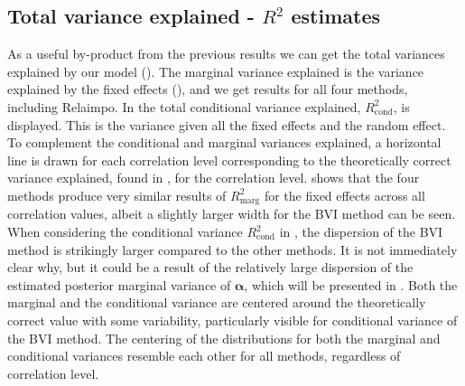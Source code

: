 \subsection{Total variance explained - $R^2$ estimates}
\label{sec:R2} 
As a useful by-product from the previous results we can get the total variances explained by our model ().
The marginal variance explained is the variance explained by the fixed effects (), and we get results for all four methods, including Relaimpo.
In  the total conditional variance explained, $R^2_{\text{cond}}$, is displayed. 
This is the variance given all the fixed effects and the random effect.
To complement the conditional and marginal variances explained, a horizontal line is drawn for each correlation level corresponding to the theoretically correct variance explained, found in , for the correlation level. 
\newline
\newline
{} shows that the four methods produce very similar results of $R^2_{\text{marg}}$ for the fixed effects across all correlation values, albeit a slightly larger width for the BVI method can be seen.
When considering the conditional variance $R^2_{\text{cond}}$ in , the dispersion of the BVI method is strikingly larger compared to the other methods. 
It is not immediately clear why, but it could be a result of the relatively large dispersion of the estimated posterior marginal variance of $\boldsymbol{\alpha}$, which will be presented in .
Both the marginal and the conditional variance are centered around the theoretically correct value with some variability, particularly visible for conditional variance of the BVI method. 
The centering of the distributions for both the marginal and conditional variances resemble each other for all methods, regardless of correlation level.
